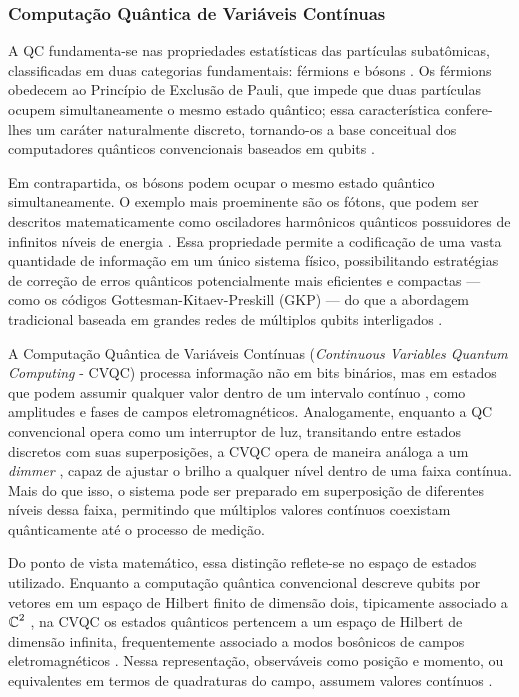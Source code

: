 \subsubsection{Computação Quântica de Variáveis Contínuas}\label{subsubsec:cvqc}

A QC fundamenta-se nas propriedades estatísticas das partículas 
subatômicas, classificadas em duas categorias fundamentais: férmions e bósons \cite{cohen2019quantum}. Os férmions obedecem ao Princípio de Exclusão de Pauli, que impede que duas partículas ocupem simultaneamente o mesmo estado quântico;  essa característica confere-lhes um caráter naturalmente discreto, tornando-os  a base conceitual dos computadores quânticos convencionais baseados em qubits \cite{sakurai2020modern}.

Em contrapartida, os bósons podem ocupar o mesmo estado quântico simultaneamente.  O exemplo mais proeminente são os fótons, que podem ser descritos matematicamente  como osciladores harmônicos quânticos possuidores de infinitos níveis de energia  \cite{braunstein2005quantum}. Essa propriedade permite a codificação de uma vasta quantidade de informação em um único sistema físico, possibilitando estratégias de correção de erros quânticos potencialmente mais eficientes e compactas — como os códigos Gottesman-Kitaev-Preskill (GKP) — do que a abordagem tradicional baseada em grandes redes de múltiplos qubits interligados \cite{gottesman2000encoding, weedbrook2012gaussian}.

A Computação Quântica de Variáveis Contínuas (\textit{Continuous Variables Quantum Computing} - CVQC) processa informação não em bits binários, mas em estados que podem assumir qualquer valor dentro de um intervalo contínuo \cite{braunstein2005quantum}, como amplitudes e fases de campos eletromagnéticos. Analogamente, enquanto a QC convencional opera como um interruptor de luz, transitando entre estados discretos com suas superposições, a CVQC opera de maneira análoga a um \textit{dimmer} \cite{lloyd1999quantum}, capaz de ajustar o brilho a qualquer nível dentro de uma faixa contínua. Mais do que isso, o sistema pode ser preparado em superposição de diferentes níveis dessa faixa, permitindo que múltiplos valores contínuos coexistam quânticamente até o processo de medição.

Do ponto de vista matemático, essa distinção reflete-se no espaço de estados utilizado. Enquanto a computação quântica convencional descreve qubits por vetores em um espaço de Hilbert finito de dimensão dois, tipicamente associado a $\operatorname{\mathbb{C}}^2$ \cite{nielsen_quantum_2002}, na CVQC os estados quânticos pertencem a um espaço de Hilbert de dimensão infinita, frequentemente associado a modos bosônicos de campos eletromagnéticos \cite{braunstein2005quantum}. Nessa representação, observáveis como posição e momento, ou equivalentes em termos de quadraturas do campo, assumem valores contínuos \cite{lloyd1999quantum,o2007optical}.

